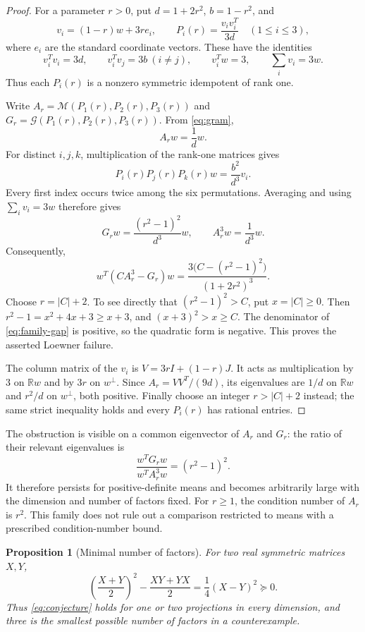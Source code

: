 \documentclass[11pt]{article}
\newtheorem{proposition}[theorem]{Proposition}
\newcommand{\R}{\mathbb R}
\newcommand{\G}{\mathcal G}
\newcommand{\M}{\mathcal M}
\begin{document}
\begin{proof}
For a parameter $r>0$, put $d=1+2r^2$, $b=1-r^2$, and
\[
 v_i=(1-r)w+3r e_i,\qquad P_i(r)=\frac{v_i v_i^T}{3d}\quad(1\le i\le3),
\]
where $e_i$ are the standard coordinate vectors. These have the identities
\begin{equation}\label{eq:gram}
 v_i^Tv_i=3d,\qquad v_i^Tv_j=3b\ (i\ne j),\qquad
 v_i^Tw=3,\qquad \sum_i v_i=3w.
\end{equation}
Thus each $P_i(r)$ is a nonzero symmetric idempotent of rank one.

Write $A_r=\M(P_1(r),P_2(r),P_3(r))$ and $G_r=\G(P_1(r),P_2(r),P_3(r))$. From \eqref{eq:gram},
\[
 A_rw=\frac1d w.
\]
For distinct $i,j,k$, multiplication of the rank-one matrices gives
\[
 P_i(r)P_j(r)P_k(r)w=\frac{b^2}{d^3}v_i.
\]
Every first index occurs twice among the six permutations. Averaging and using $\sum_i v_i=3w$ therefore gives
\begin{equation}\label{eq:family-action}
 G_rw=\frac{(r^2-1)^2}{d^3}w,\qquad
 A_r^3w=\frac1{d^3}w.
\end{equation}
Consequently,
\begin{equation}\label{eq:family-gap}
 w^T(CA_r^3-G_r)w
  =\frac{3\bigl(C-(r^2-1)^2\bigr)}{(1+2r^2)^3}.
\end{equation}
Choose $r=|C|+2$. To see directly that $(r^2-1)^2>C$, put $x=|C|\ge0$. Then
$r^2-1=x^2+4x+3\ge x+3$, and $(x+3)^2>x\ge C$.
The denominator of \eqref{eq:family-gap} is positive, so the quadratic form is negative. This proves the asserted Loewner failure.

The column matrix of the $v_i$ is $V=3rI+(1-r)J$. It acts as multiplication by $3$ on $\R w$ and by $3r$ on $w^\perp$. Since $A_r=VV^T/(9d)$, its eigenvalues are $1/d$ on $\R w$ and $r^2/d$ on $w^\perp$, both positive. Finally choose an integer $r>|C|+2$ instead; the same strict inequality holds and every $P_i(r)$ has rational entries.
\end{proof}

The obstruction is visible on a common eigenvector of $A_r$ and $G_r$: the ratio of their relevant eigenvalues is
\[
 \frac{w^TG_rw}{w^TA_r^3w}=(r^2-1)^2.
\]
It therefore persists for positive-definite means and becomes arbitrarily large with the dimension and number of factors fixed. For $r\ge1$, the condition number of $A_r$ is $r^2$. This family does not rule out a comparison restricted to means with a prescribed condition-number bound.

\begin{proposition}[Minimal number of factors]\label{prop:two}
For two real symmetric matrices $X,Y$,
\[
 \left(\frac{X+Y}{2}\right)^2-\frac{XY+YX}{2}
   =\frac14(X-Y)^2\succeq0.
\]
Thus \eqref{eq:conjecture} holds for one or two projections in every dimension, and three is the smallest possible number of factors in a counterexample.
\end{proposition}
\end{document}

